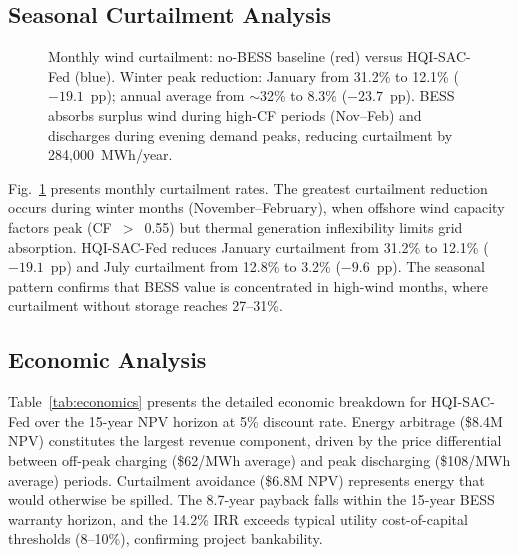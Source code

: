 \documentclass[journal]{IEEEtran}
\begin{document}
\subsection{Seasonal Curtailment Analysis}

\begin{figure}[t]
\centering
{}
\caption{Monthly wind curtailment: no-BESS baseline (red) versus
HQI-SAC-Fed (blue). Winter peak reduction: January from 31.2\% to
12.1\% ($-19.1$~pp); annual average from $\sim$32\% to 8.3\%
($-23.7$~pp). BESS absorbs surplus wind during high-CF periods
(Nov--Feb) and discharges during evening demand peaks, reducing
curtailment by 284,000~MWh/year.}
\label{fig:curtailment}
\end{figure}

Fig.~\ref{fig:curtailment} presents monthly curtailment rates. The
greatest curtailment reduction occurs during winter months
(November--February), when offshore wind capacity factors peak
(CF~$>$~0.55) but thermal generation inflexibility limits grid
absorption. HQI-SAC-Fed reduces January curtailment from 31.2\% to
12.1\% ($-19.1$~pp) and July curtailment from 12.8\% to 3.2\%
($-9.6$~pp). The seasonal pattern confirms that BESS value is
concentrated in high-wind months, where curtailment without storage
reaches 27--31\%.

\subsection{Economic Analysis}

Table~\ref{tab:economics} presents the detailed economic breakdown for
HQI-SAC-Fed over the 15-year NPV horizon at 5\% discount rate. Energy
arbitrage (\$8.4M NPV) constitutes the largest revenue component,
driven by the price differential between off-peak charging
(\$62/MWh average) and peak discharging (\$108/MWh average) periods.
Curtailment avoidance (\$6.8M NPV) represents energy that would
otherwise be spilled. The 8.7-year payback falls within the 15-year
BESS warranty horizon, and the 14.2\% IRR exceeds typical utility
cost-of-capital thresholds (8--10\%), confirming project bankability.
\end{document}
